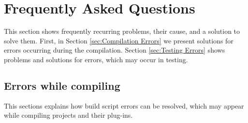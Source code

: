 \section{Frequently Asked Questions}
\label{sec:FAQ}
This section shows frequently recurring problems, their cause, and a solution to solve them. First, in Section \ref{sec:Compilation Errors} we present solutions for errors occurring during the compilation. Section \ref{sec:Testing Errors} shows problems and solutions for errors, which may occur in testing.
\subsection{Errors while compiling}
This sections explains how build script errors can be resolved, which may appear while compiling projects and their plug-ins.
\label{sec:Compilation Errors}

